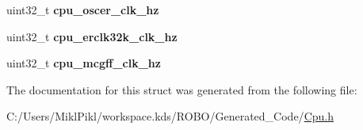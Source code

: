 \begin{DoxyCompactItemize}
\item 
\hypertarget{struct_t_cpu_clock_configuration_a8573f3896f85f97201ef2d6252d99905}{}uint32\+\_\+t {\bfseries cpu\+\_\+oscer\+\_\+clk\+\_\+hz}\label{struct_t_cpu_clock_configuration_a8573f3896f85f97201ef2d6252d99905}

\item 
\hypertarget{struct_t_cpu_clock_configuration_a3f68e3893f7dec551e938a909929687b}{}uint32\+\_\+t {\bfseries cpu\+\_\+erclk32k\+\_\+clk\+\_\+hz}\label{struct_t_cpu_clock_configuration_a3f68e3893f7dec551e938a909929687b}

\item 
\hypertarget{struct_t_cpu_clock_configuration_a5bd9b1235d0f85073ed01c126782d898}{}uint32\+\_\+t {\bfseries cpu\+\_\+mcgff\+\_\+clk\+\_\+hz}\label{struct_t_cpu_clock_configuration_a5bd9b1235d0f85073ed01c126782d898}

\end{DoxyCompactItemize}


The documentation for this struct was generated from the following file\+:\begin{DoxyCompactItemize}
\item 
C\+:/\+Users/\+Mikl\+Pikl/workspace.\+kds/\+R\+O\+B\+O/\+Generated\+\_\+\+Code/\hyperlink{_cpu_8h}{Cpu.\+h}\end{DoxyCompactItemize}
